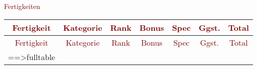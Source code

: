 \begin{center}
\textcolor{Maroon}{\Large Fertigkeiten}

\begin{longtable}{p{5cm}p{5cm}rrrrr}

\multicolumn{1}{c}{\textcolor{Maroon}{Fertigkeit}} & \multicolumn{1}{c}{\textcolor{Maroon}{Kategorie}} & \multicolumn{1}{c}{\textcolor{Maroon}{Rank}} & \multicolumn{1}{c}{\textcolor{Maroon}{Bonus}} & \multicolumn{1}{c}{\textcolor{Maroon}{Spec}} & \multicolumn{1}{c}{\textcolor{Maroon}{Ggst.}} & \multicolumn{1}{c}{\textcolor{Maroon}{Total}} \\ \hline 
\endfirsthead

\multicolumn{1}{c}{\textcolor{Maroon}{Fertigkeit}} & \multicolumn{1}{c}{\textcolor{Maroon}{Kategorie}} & \multicolumn{1}{c}{\textcolor{Maroon}{Rank}} & \multicolumn{1}{c}{\textcolor{Maroon}{Bonus}} & \multicolumn{1}{c}{\textcolor{Maroon}{Spec}} & \multicolumn{1}{c}{\textcolor{Maroon}{Ggst.}} & \multicolumn{1}{c}{\textcolor{Maroon}{Total}} \\
\hline 
\endhead

\endfoot

\endlastfoot
==>fulltable

\end{longtable}
\end{center}

